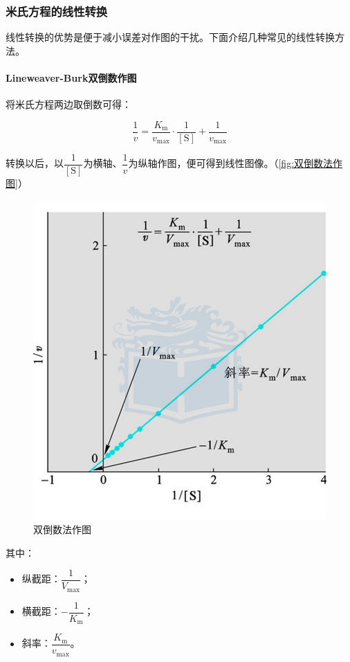\subsubsection{米氏方程的线性转换}

线性转换的优势是便于减小误差对作图的干扰。下面介绍几种常见的线性转换方法。

\paragraph{Lineweaver-Burk双倒数作图}

将米氏方程两边取倒数可得：

\[\frac{1}{v} = \frac{K_\text{m}}{v_{\text{max}}} \cdot \frac{1}{[\text{S}]} + \frac{1}{v_{\text{max}}}\]

转换以后，以$\dfrac{1}{[\text{S}]}$为横轴、$\dfrac{1}{v}$为纵轴作图，便可得到线性图像。（\autoref{fig:双倒数法作图}）

\begin{figure}[htbp]
	\centering
	\includegraphics[width=0.7\linewidth]{Pics/双倒数法作图}
	\caption{双倒数法作图}
	\label{fig:双倒数法作图}
\end{figure}

其中：

\begin{itemize}
	\item 纵截距：$\dfrac{1}{V_{\text{max}}}$；
	\item 横截距：$-\dfrac{1}{K_{\text{m}}}$；
	\item 斜率：$\dfrac{K_{\text{m}}}{v_{\text{max}}}$。
\end{itemize}

